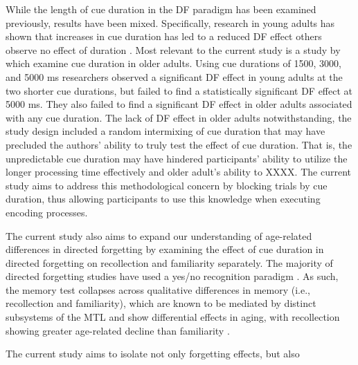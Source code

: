 \documentclass[man]{apa6}
\begin{document}
While the length of cue duration in the DF paradigm has been examined previously, results have been mixed. Specifically, research in young adults has shown that increases in cue duration has led to a reduced DF effect \parencite{lee.lee.tsai2007} others observe no effect of duration \parencite{allen.vokey1998,bancroft.hockley.farquhar2013}. Most relevant to the current study is a study by \textcite[Exp. 2]{dulaney.marks.link2004} which examine cue duration in older adults. Using cue durations of 1500, 3000, and 5000 ms researchers observed a significant DF effect in young adults at the two shorter cue durations, but failed to find a statistically significant DF effect at 5000 ms. They also failed to find a significant DF effect in older adults associated with any cue duration. The lack of DF effect in older adults notwithstanding, the study design included a random intermixing of cue duration that may have precluded the authors’ ability to truly test the effect of cue duration. That is, the unpredictable cue duration may have hindered participants’ ability to utilize the longer processing time effectively and older adult’s ability to XXXX. The current study aims to address this methodological concern by blocking trials by cue duration, thus allowing participants to use this knowledge when executing encoding processes.

The current study also aims to expand our understanding of age-related differences in directed forgetting by examining the effect of cue duration in directed forgetting on recollection and familiarity separately. The majority of directed forgetting studies have used a yes/no recognition paradigm \parencite[but see][]{gardiner.gawlik.richardson1994, rizio.dennis2013,rizio.dennis2014plos}. As such, the memory test collapses across qualitative differences in memory (i.e., recollection and familiarity), which are known to be mediated by distinct subsystems of the MTL \parencite[e.g.,][]{diana.yonelinas.ranganath2007mtl, yonelinas.et.al.2005mtl} and show differential effects in aging, with recollection showing greater age-related decline than familiarity \parencite{parkin.walter1992,jennings.jacoby1993,mantyla1993,java1996,davidson.glisky2002,yonelinas2002recfamreview,bastin.vanderlinden2003,howard.et.al2006}.

The current study aims to isolate not only forgetting effects, but also
\end{document}
